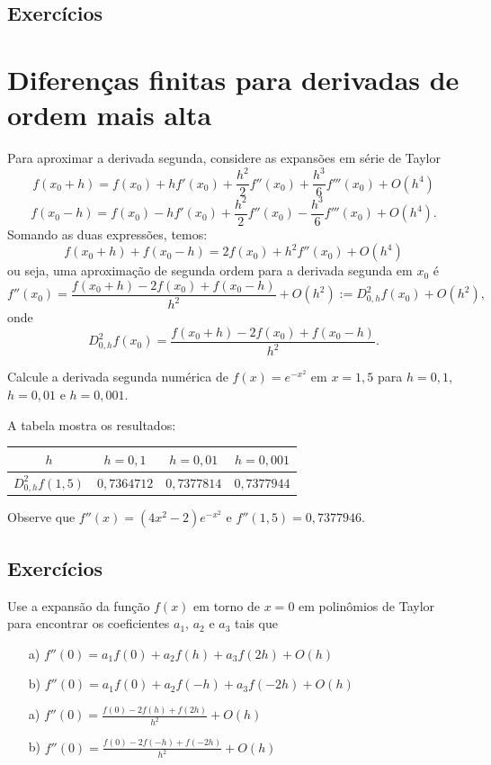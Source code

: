 \subsection*{Exercícios}

\emconstrucao

\section{Diferenças finitas para derivadas de ordem mais alta}

Para aproximar a derivada segunda, considere as expansões em série de Taylor
$$
f(x_0+h)=f(x_0)+hf'(x_0)+\frac{h^2}{2}f''(x_0)+\frac{h^3}{6}f'''(x_0)+O(h^4)
$$
$$
f(x_0-h)=f(x_0)-hf'(x_0)+\frac{h^2}{2}f''(x_0)-\frac{h^3}{6}f'''(x_0)+O(h^4).
$$
Somando as duas expressões, temos:
$$
f(x_0+h)+f(x_0-h)=2f(x_0)+h^2f''(x_0)+O(h^4)
$$
ou seja, uma aproximação de segunda ordem para a derivada segunda em $x_0$ é
$$
f''(x_0)=\frac{f(x_0+h)-2f(x_0)+f(x_0-h)}{h^2}+O(h^2):=D^2_{0,h}f(x_0)+O(h^2),
$$
onde
$$
D^2_{0,h}f(x_0)=\frac{f(x_0+h)-2f(x_0)+f(x_0-h)}{h^2}.
$$
\begin{ex}
Calcule a derivada segunda numérica de $f(x)=e^{-x^2}$ em $x=1,5$ para $h=0,1$, $h=0,01$ e $h=0,001$.
\end{ex}
\begin{sol}
A tabela mostra os resultados:
\begin{center}
  \begin{tabular}{|c|c|c|c|}\hline
    $h$ & $h=0,1$ & $h=0,01$ & $h=0,001$\\\hline
    $D^2_{0,h}f(1,5)$ & $0,7364712$ & $0,7377814$ & $0,7377944$\\\hline
  \end{tabular}  
\end{center}
Observe que $f''(x)=(4x^2-2)e^{-x^2}$ e $f''(1,5)=0,7377946$.  
\end{sol}

\subsection*{Exercícios}

\begin{exer} Use a expansão da função $f(x)$ em torno de $x=0$ em polinômios de Taylor para encontrar os coeficientes $a_1$, $a_2$ e $a_3$ tais que
\begin{itemize}
\item[a)] $f''(0)=a_1f(0)+a_2f(h)+a_3f(2h) + O(h)$
\item[b)] $f''(0)=a_1f(0)+a_2f(-h)+a_3f(-2h) + O(h)$
\end{itemize}
\end{exer}
\begin{resp}
  
\begin{itemize}
\item[a)] $f''(0)=\frac{f(0)-2f(h)+f(2h)}{h^2}+O(h)$
\item[b)] $f''(0)=\frac{f(0)-2f(-h)+f(-2h)}{h^2}+O(h)$
\end{itemize}    
  
\end{resp}

